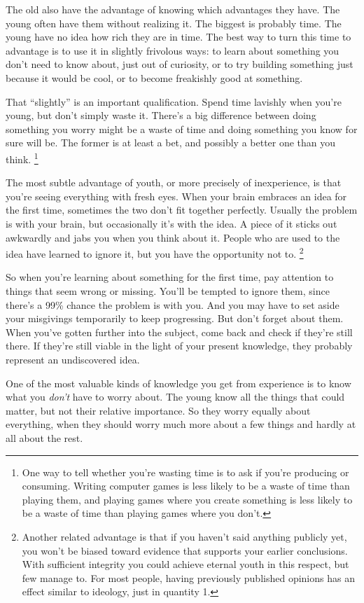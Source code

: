The old also have the advantage of knowing which advantages they have.
The young often have them without realizing it. The biggest is probably
time. The young have no idea how rich they are in time. The best way to
turn this time to advantage is to use it in slightly frivolous ways: to
learn about something you don't need to know about, just out of
curiosity, or to try building something just because it would be cool,
or to become freakishly good at something.

That ``slightly'' is an important qualification. Spend time lavishly
when you're young, but don't simply waste it. There's a big difference
between doing something you worry might be a waste of time and doing
something you know for sure will be. The former is at least a bet, and
possibly a better one than you think. \footnote{One way to tell whether you're wasting time is to ask if you're
producing or consuming. Writing computer games is less likely to be a
waste of time than playing them, and playing games where you create
something is less likely to be a waste of time than playing games where
you don't.}

The most subtle advantage of youth, or more precisely of inexperience,
is that you're seeing everything with fresh eyes. When your brain
embraces an idea for the first time, sometimes the two don't fit
together perfectly. Usually the problem is with your brain, but
occasionally it's with the idea. A piece of it sticks out awkwardly and
jabs you when you think about it. People who are used to the idea have
learned to ignore it, but you have the opportunity not to.
\footnote{Another related advantage is that if you haven't said anything
publicly yet, you won't be biased toward evidence that supports your
earlier conclusions. With sufficient integrity you could achieve eternal
youth in this respect, but few manage to. For most people, having
previously published opinions has an effect similar to ideology, just in
quantity 1.}

So when you're learning about something for the first time, pay
attention to things that seem wrong or missing. You'll be tempted to
ignore them, since there's a 99\% chance the problem is with you. And
you may have to set aside your misgivings temporarily to keep
progressing. But don't forget about them. When you've gotten further
into the subject, come back and check if they're still there. If they're
still viable in the light of your present knowledge, they probably
represent an undiscovered idea.

One of the most valuable kinds of knowledge you get from experience is
to know what you \emph{don't} have to worry about. The young know all
the things that could matter, but not their relative importance. So they
worry equally about everything, when they should worry much more about a
few things and hardly at all about the rest.

